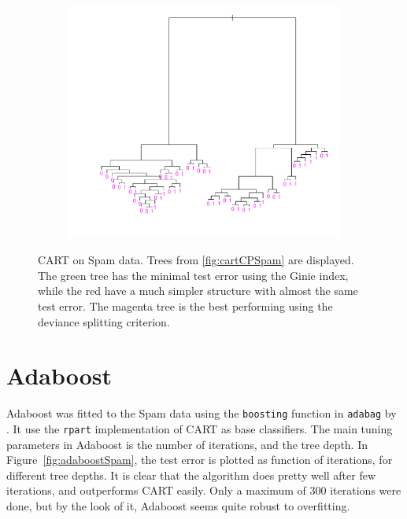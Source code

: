 \begin{figure}[htb]
\begin{subfigure}[b]{0.48\textwidth}
  \end{subfigure}
  \quad
  \begin{subfigure}[b]{0.48\textwidth}
    \includegraphics[width=\textwidth]{./figures/cartOptDevianceSpam.pdf}
  \end{subfigure}
  \vspace{1\baselineskip}
  \caption{CART on Spam data. Trees from \ref{fig:cartCPSpam} are displayed. The green tree has the minimal test error using the Ginie index, while the red have a much simpler structure with almost the same test error. The magenta tree is the best performing using the deviance splitting criterion.}
  \label{fig:CartSpam}
\end{figure}


\section{Adaboost}
\label{sec:SimAdaBoost}
Adaboost was fitted to the Spam data using the \verb+boosting+ function in \verb+adabag+ by \cite{adabag}. It use the \verb+rpart+ implementation of CART as base classifiers. The main tuning parameters in Adaboost is the number of iterations, and the tree depth. In Figure~\ref{fig:adaboostSpam}, the test error is plotted as function of iterations, for different tree depths. It is clear that the algorithm does pretty well after few iterations, and outperforms CART easily. Only a maximum of 300 iterations were done, but by the look of it, Adaboost seems quite robust to overfitting. 


